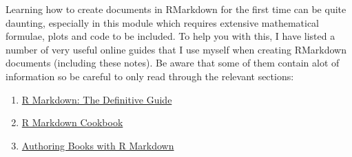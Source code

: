 \documentclass[
]{book}
\theoremstyle{definition}
\theoremstyle{definition}
\theoremstyle{definition}
\theoremstyle{definition}
\theoremstyle{remark}
\begin{document}
Learning how to create documents in RMarkdown for the first time can be quite daunting, especially in this module which requires extensive mathematical formulae, plots and code to be included. To help you with this, I have listed a number of very useful online guides that I use myself when creating RMarkdown documents (including these notes). Be aware that some of them contain alot of information so be careful to only read through the relevant sections:

\begin{enumerate}
\def\labelenumi{\arabic{enumi}.}
\item
  \href{https://bookdown.org/yihui/rmarkdown/}{R Markdown: The Definitive Guide}
\item
  \href{https://bookdown.org/yihui/rmarkdown-cookbook/}{R Markdown Cookbook}
\item
  \href{https://bookdown.org/yihui/bookdown/}{Authoring Books with R Markdown}
\end{enumerate}
\end{document}
